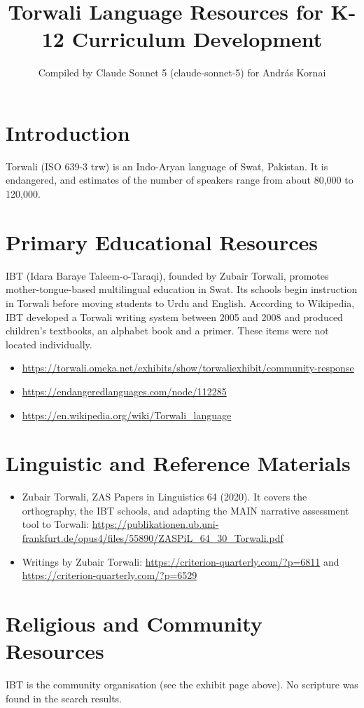 \documentclass[12pt]{article}
\title{Torwali Language Resources for K-12 Curriculum Development}
\author{Compiled by Claude Sonnet 5 (claude-sonnet-5) for Andr\'as Kornai}
\date{}
\begin{document}
\maketitle
\section{Introduction}
Torwali (ISO 639-3 trw) is an Indo-Aryan language of Swat, Pakistan. It is endangered, and estimates of the number of speakers range from about 80,000 to 120,000.
\section{Primary Educational Resources}
IBT (Idara Baraye Taleem-o-Taraqi), founded by Zubair Torwali, promotes mother-tongue-based multilingual education in Swat. Its schools begin instruction in Torwali before moving students to Urdu and English. According to Wikipedia, IBT developed a Torwali writing system between 2005 and 2008 and produced children's textbooks, an alphabet book and a primer. These items were not located individually.
\begin{itemize}
\item \url{https://torwali.omeka.net/exhibits/show/torwaliexhibit/community-response}
\item \url{https://endangeredlanguages.com/node/112285}
\item \url{https://en.wikipedia.org/wiki/Torwali_language}
\end{itemize}
\section{Linguistic and Reference Materials}
\begin{itemize}
\item Zubair Torwali, ZAS Papers in Linguistics 64 (2020). It covers the orthography, the IBT schools, and adapting the MAIN narrative assessment tool to Torwali: \url{https://publikationen.ub.uni-frankfurt.de/opus4/files/55890/ZASPiL_64_30_Torwali.pdf}
\item Writings by Zubair Torwali: \url{https://criterion-quarterly.com/?p=6811} and \url{https://criterion-quarterly.com/?p=6529}
\end{itemize}
\section{Religious and Community Resources}
IBT is the community organisation (see the exhibit page above). No scripture was found in the search results.
\end{document}
